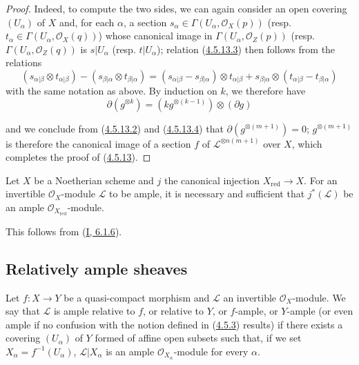 \begin{proof}
Indeed, to compute the two sides, we can again consider an open
covering $(U_\alpha)$ of $X$ and, for each $\alpha$, a section
$s_\alpha\in\Gamma(U_\alpha,\mathcal{O}_X(p))$ (resp.
$t_\alpha\in\Gamma(U_\alpha,\mathcal{O}_X(q))$) whose canonical image in
$\Gamma(U_\alpha,\mathcal{O}_Z(p))$ (resp.
$\Gamma(U_\alpha,\mathcal{O}_Z(q))$ is $s|U_\alpha$ (resp.
$t|U_\alpha$); relation
(\hyperref[II.4.5.13.3]{4.5.13.3}) then follows from the relations
\[
  (s_{\alpha|\beta}\otimes t_{\alpha|\beta})
  -(s_{\beta|\alpha}\otimes t_{\beta|\alpha})
  =(s_{\alpha|\beta}-s_{\beta|\alpha})\otimes t_{\alpha|\beta}
  +s_{\beta|\alpha}\otimes(t_{\alpha|\beta}-t_{\beta|\alpha})
\]
with the same notation as above. By induction on $k$, we therefore have
\begin{equation}
\label{II.4.5.13.4}
  \partial(g^{\otimes k})=(kg^{\otimes(k-1)})\otimes(\partial g)
\tag{4.5.13.4}
\end{equation}


and we conclude from (\hyperref[II.4.5.13.2]{4.5.13.2}) and
(\hyperref[II.4.5.13.4]{4.5.13.4}) that
$\partial(g^{\otimes(m+1)})=0$; $g^{\otimes(m+1)}$ is therefore the
canonical image of a section $f$ of $\mathcal{L}^{\otimes n(m+1)}$ over
$X$, which completes the proof of (\hyperref[II.4.5.13]{4.5.13}).
\end{proof}

\begin{corollary}[4.5.14]
\label{II.4.5.14}
Let $X$ be a Noetherian scheme and $j$ the canonical injection
$X_{\mathrm{red}}\to X$. For an invertible $\mathcal{O}_X$-module
$\mathcal{L}$ to be ample, it is necessary and sufficient that $j^*(\mathcal{L})$ be
an ample $\mathcal{O}_{X_{\mathrm{red}}}$-module.
\end{corollary}

This follows from (\hyperref[I.6.1.6]{I, 6.1.6}).


\subsection{Relatively ample sheaves}
\label{II.4.6}

\begin{definition}[4.6.1]
\label{II.4.6.1}
Let $f:X\to Y$ be a quasi-compact morphism and $\mathcal{L}$ an invertible
$\mathcal{O}_X$-module. We say that $\mathcal{L}$ is ample
relative to $f$, or relative to $Y$, or $f$-ample, or $Y$-ample (or
even ample if no confusion with the notion defined in
(\hyperref[II.4.5.3]{4.5.3}) results) if there exists a covering $(U_\alpha)$
of $Y$ formed of affine open subsets such that, if we set
$X_\alpha=f^{-1}(U_\alpha)$, $\mathcal{L}|X_\alpha$ is an ample
$\mathcal{O}_{X_\alpha}$-module for every $\alpha$.
\end{definition}

